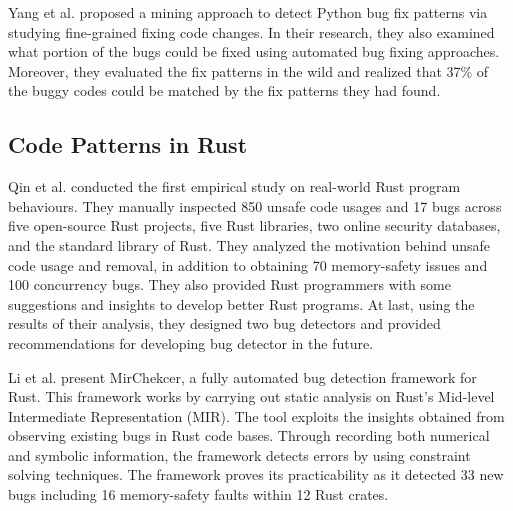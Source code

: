 Yang et al. \cite{yang2022mining} proposed a mining approach to detect Python bug fix patterns via studying fine-grained fixing code changes. In their research, they also examined what portion of the bugs could be fixed using automated bug fixing approaches. Moreover, they evaluated the fix patterns in the wild and realized that 37\% of the buggy codes could be matched by the fix patterns they had found. 


\subsection{Code Patterns in Rust}


Qin et al. \cite{qin2020understanding} conducted the first empirical study on real-world Rust program behaviours. They manually inspected 850 unsafe code usages and 17 bugs across five open-source Rust projects, five Rust libraries, two online security databases, and the standard library of Rust. They analyzed the motivation behind unsafe code usage and removal, in addition to obtaining 70 memory-safety issues and 100 concurrency bugs. They also provided Rust programmers with some suggestions and insights to develop better Rust programs. At last, using the results of their analysis, they designed two bug detectors and provided recommendations for developing bug detector in the future.

Li et al. \cite{li2021mirchecker} present MirChekcer, a fully automated bug detection framework for Rust. This framework works by carrying out static analysis on Rust's Mid-level Intermediate Representation (MIR). The tool exploits the insights obtained from observing existing bugs in Rust code bases. Through recording both numerical and symbolic information, the framework detects errors by using constraint solving techniques. The framework proves its practicability as it detected 33 new bugs including 16 memory-safety faults within 12 Rust crates.


